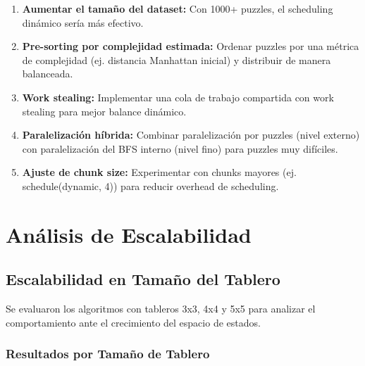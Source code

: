 \documentclass[12pt,a4paper]{article}
\begin{document}
\begin{enumerate}
    \item \textbf{Aumentar el tamaño del dataset:} Con 1000+ puzzles, el scheduling dinámico sería más efectivo.
    
    \item \textbf{Pre-sorting por complejidad estimada:} Ordenar puzzles por una métrica de complejidad (ej. distancia Manhattan inicial) y distribuir de manera balanceada.
    
    \item \textbf{Work stealing:} Implementar una cola de trabajo compartida con work stealing para mejor balance dinámico.
    
    \item \textbf{Paralelización híbrida:} Combinar paralelización por puzzles (nivel externo) con paralelización del BFS interno (nivel fino) para puzzles muy difíciles.
    
    \item \textbf{Ajuste de chunk size:} Experimentar con chunks mayores (ej. schedule(dynamic, 4)) para reducir overhead de scheduling.
\end{enumerate}

\section{Análisis de Escalabilidad}

\subsection{Escalabilidad en Tamaño del Tablero}

Se evaluaron los algoritmos con tableros 3x3, 4x4 y 5x5 para analizar el comportamiento ante el crecimiento del espacio de estados.

\subsubsection{Resultados por Tamaño de Tablero}
\end{document}
